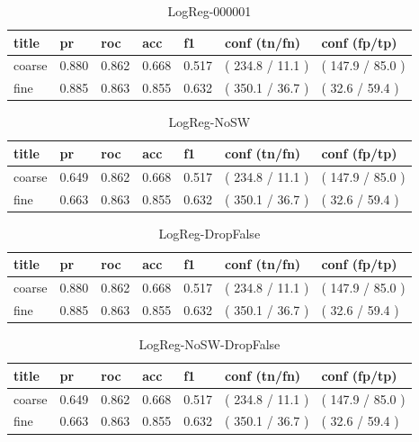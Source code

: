 \documentclass[ms]{nuthesis}
\begin{document}
\FloatBarrier
\begin{table}[H]
\centering
\begin{tabular}{|l||l||l||l||l||l||l|}\toprule
title & pr & roc & acc & f1 & conf (tn/fn) & conf (fp/tp) \\ \midrule
coarse & 0.880 & 0.862 & 0.668 & 0.517 & ( 234.8 / 11.1 ) & ( 147.9 / 85.0 ) \\
fine & 0.885 & 0.863 & 0.855 & 0.632 & ( 350.1 / 36.7 ) & ( 32.6 / 59.4 ) \\ \bottomrule
\end{tabular}
\caption{LogReg-000001}
\label{tab:LogReg-000001}
\end{table}
\FloatBarrier


\FloatBarrier
\begin{table}[h]
\centering
\begin{tabular}{|l||l||l||l||l||l||l|}\toprule
title & pr & roc & acc & f1 & conf (tn/fn) & conf (fp/tp) \\ \midrule
coarse & 0.649 & 0.862 & 0.668 & 0.517 & ( 234.8 / 11.1 ) & ( 147.9 / 85.0 ) \\
fine & 0.663 & 0.863 & 0.855 & 0.632 & ( 350.1 / 36.7 ) & ( 32.6 / 59.4 ) \\ \bottomrule
\end{tabular}
\caption{LogReg-NoSW}
\label{tab:LogReg-NoSW}
\end{table}
\FloatBarrier

\FloatBarrier
\begin{table}[h]
\centering
\begin{tabular}{|l||l||l||l||l||l||l|}\toprule
title & pr & roc & acc & f1 & conf (tn/fn) & conf (fp/tp) \\ \midrule
coarse & 0.880 & 0.862 & 0.668 & 0.517 & ( 234.8 / 11.1 ) & ( 147.9 / 85.0 ) \\
fine & 0.885 & 0.863 & 0.855 & 0.632 & ( 350.1 / 36.7 ) & ( 32.6 / 59.4 ) \\ \bottomrule
\end{tabular}
\caption{LogReg-DropFalse}
\label{tab:LogReg-DropFalse}
\end{table}
\FloatBarrier

\FloatBarrier
\begin{table}[h]
\centering
\begin{tabular}{|l||l||l||l||l||l||l|}\toprule
title & pr & roc & acc & f1 & conf (tn/fn) & conf (fp/tp) \\ \midrule
coarse & 0.649 & 0.862 & 0.668 & 0.517 & ( 234.8 / 11.1 ) & ( 147.9 / 85.0 ) \\
fine & 0.663 & 0.863 & 0.855 & 0.632 & ( 350.1 / 36.7 ) & ( 32.6 / 59.4 ) \\ \bottomrule
\end{tabular}
\caption{LogReg-NoSW-DropFalse}
\label{tab:LogReg-NoSW-DropFalse}
\end{table}
\FloatBarrier
\end{document}
